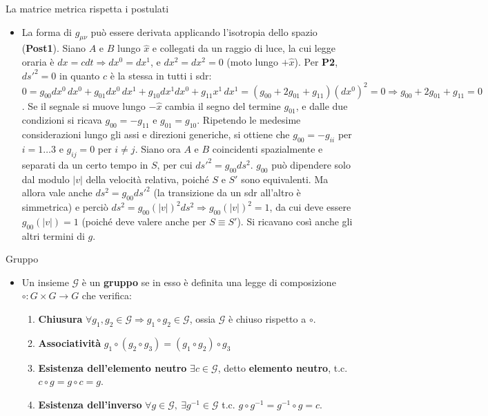 \documentclass[a4_2,grid,frame]{flashcards}
\newenvironment{cartaflash}
    {\vspace{-15pt}
    \begin{itemize}
    }
    {
    \end{itemize}
    }
\begin{document}
\begin{flashcard}[Dimostrazione]{La matrice metrica rispetta i postulati} %
\begin{cartaflash}
\item La forma di $g_{\mu\nu}$ può essere derivata applicando l'isotropia dello spazio (\textbf{Post1}). Siano $A$ e $B$ lungo $\hat{x}$ e collegati da un raggio di luce, la cui legge oraria è $dx = cdt \Rightarrow dx^0 = dx^1$, e $dx^2 = dx^2 = 0$ (moto lungo $+\hat{x}$). Per \textbf{P2}, $ds'^2 = 0$ in quanto $c$ è la stessa in tutti i sdr: $0 = g_{00} dx^0\,dx^0 + g_{01} dx^0\,dx^1 + g_{10} dx^1 dx^0 + g_{11}x^1\,dx^1 = (g_{00}+2g_{01}+g_{11})(dx^0)^2 = 0 \Rightarrow g_{00}+2g_{01}+g_{11} = 0$. Se il segnale si muove lungo $-\hat{x}$ cambia il segno del termine $g_{01}$, e dalle due condizioni si ricava $g_{00} = -g_{11}$ e $g_{01} = g_{10}$. Ripetendo le medesime considerazioni lungo gli assi e direzioni generiche, si ottiene che $g_{00} = -g_{ii}$ per $i = 1\dots 3$ e $g_{ij} = 0$ per $i\neq j$. 
Siano ora $A$ e $B$ coincidenti spazialmente e separati da un certo tempo in $S$, per cui $ds'^2 = g_{00} ds^2$. $g_{00}$ può dipendere solo dal modulo $|v|$ della velocità relativa, poiché $S$ e $S'$ sono equivalenti. Ma allora vale anche $ds^2 = g_{00}ds'^2$ (la transizione da un sdr all'altro è simmetrica) e perciò $ds^2 = g_{00}(|v|)^2 ds^2 \Rightarrow g_{00}(|v|)^2 = 1$, da cui deve essere $g_{00}(|v|) = 1$ (poiché deve valere anche per $S \equiv S'$). Si ricavano così anche gli altri termini di $g$. 
\end{cartaflash}
\end{flashcard}

\begin{flashcard}[Proprietà]{Gruppo}
\begin{cartaflash}
\item Un insieme $\mathcal{G}$ è un \textbf{gruppo} se in esso è definita una legge di composizione $\circ: G\times G \to G$ che verifica:
\begin{enumerate}
    \item \textbf{Chiusura} $\forall g_1, g_2 \in \mathcal{G} \Rightarrow g_1 \circ g_2 \in \mathcal{G}$, ossia $\mathcal{G}$ è chiuso rispetto a $\circ$.
    \item \textbf{Associatività} $g_1 \circ (g_2 \circ g_3) = (g_1 \circ g_2) \circ g_3$
    \item \textbf{Esistenza dell'elemento neutro} $\exists c \in \mathcal{G}$, detto \textbf{elemento neutro}, t.c. $c \circ g = g \circ c = g$.
    \item \textbf{Esistenza dell'inverso} $\forall g \in \mathcal{G}, \> \exists g^{-1} \in \mathcal{G}$ t.c. $g\circ g^{-1} = g^{-1} \circ g = c$. 
\end{enumerate}
\end{cartaflash}
\end{flashcard}
\end{document}
